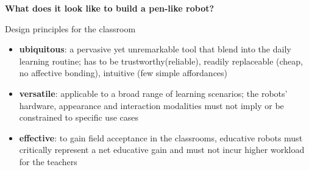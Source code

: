\documentclass[compress]{beamer}
\begin{document}



\begin{frame}[plain]
    \Large\bf\centering
    What does it look like to build a pen-like robot?
\end{frame}




{
 \begin{frame}{Design principles for the classroom}

     \begin{itemize}
         \item<1-> {\bf ubiquitous}: a pervasive yet unremarkable tool
             that blend into the daily learning routine; has to be
             trustworthy(\ie reliable), readily replaceable (\ie cheap, no
             affective bonding), intuitive (\ie few simple affordances)

         \item<2-> {\bf versatile}: applicable to a broad range of learning
             scenarios; the robots’ hardware, appearance and interaction
             modalities must not imply or be constrained to specific use cases

         \item<3-> {\bf effective}: to gain field
             acceptance in the classrooms, educative robots must critically
             represent a net educative gain and must not incur higher
             workload for the teachers
     \end{itemize}

 \end{frame}
}


\end{document}
